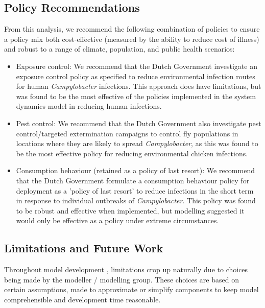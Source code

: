 \subsection{Policy Recommendations}
From this analysis, we recommend the following combination of policies to ensure a policy mix both cost-effective (measured by the ability to reduce cost of illness) and robust to a range of climate, population, and public health scenarios:
\begin{itemize}
    \item Exposure control: We recommend that the Dutch Government investigate an exposure control policy as specified to reduce environmental infection routes for human \textit{Campylobacter} infections. This approach does have limitations, but was found to be the most effective of the policies implemented in the system dynamics model in reducing human infections.
    \item Pest control: We recommend that the Dutch Government also investigate pest control/targeted extermination campaigns to control fly populations in locations where they are likely to spread \textit{Campylobacter}, as this was found to be the most effective policy for reducing environmental chicken infections.
    \item Consumption behaviour (retained as a policy of last resort): We recommend that the Dutch Government formulate a consumption behaviour policy for deployment as a 'policy of last resort' to reduce infections in the short term in response to individual outbreaks of \textit{Campylobacter}. This policy was found to be robust and effective when implemented, but modelling suggested it would only be effective as a policy under extreme circumstances.
\end{itemize}

\subsection{Limitations and Future Work}

Throughout model development , limitations crop up naturally due to choices being made by the modeller / modelling group. These choices are based on certain assumptions, made to approximate or simplify components to keep model comprehensible and development time reasonable.

